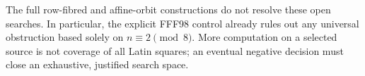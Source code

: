 The full row-fibred and affine-orbit constructions do not resolve
these open searches. In particular, the explicit FFF98 control
already rules out any universal obstruction based solely on
$n\equiv2\pmod8$. More computation on a selected source is not
coverage of all Latin squares; an eventual negative decision must
close an exhaustive, justified search space.
